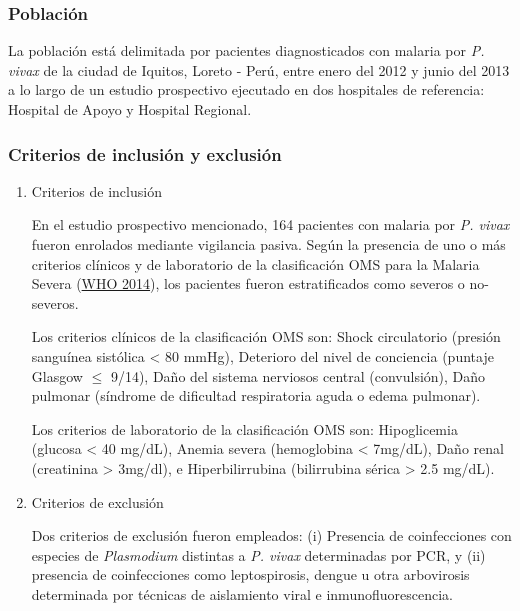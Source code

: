 \documentclass[
  a4paper]{article}
\begin{document}
\hypertarget{poblaciuxf3n}{%
\subsubsection{Población}\label{poblaciuxf3n}}

La población está delimitada por pacientes diagnosticados con malaria
por \emph{P. vivax} de la ciudad de Iquitos, Loreto - Perú, entre enero
del 2012 y junio del 2013 a lo largo de un estudio prospectivo ejecutado
en dos hospitales de referencia: Hospital de Apoyo y Hospital Regional.

\hypertarget{criterios-de-inclusiuxf3n-y-exclusiuxf3n}{%
\subsubsection{Criterios de inclusión y
exclusión}\label{criterios-de-inclusiuxf3n-y-exclusiuxf3n}}

\begin{enumerate}
\def\labelenumi{\alph{enumi}.}
\item
  Criterios de inclusión

  En el estudio prospectivo mencionado, 164 pacientes con malaria por
  \emph{P. vivax} fueron enrolados mediante vigilancia pasiva. Según la
  presencia de uno o más criterios clínicos y de laboratorio de la
  clasificación OMS para la Malaria Severa
  (\protect\hyperlink{ref-WHO2014severe}{WHO 2014}), los pacientes
  fueron estratificados como severos o no-severos.

  Los criterios clínicos de la clasificación OMS son: Shock circulatorio
  (presión sanguínea sistólica \textless{} 80 mmHg), Deterioro del nivel
  de conciencia (puntaje Glasgow \(\le\) 9/14), Daño del sistema
  nerviosos central (convulsión), Daño pulmonar (síndrome de dificultad
  respiratoria aguda o edema pulmonar).

  Los criterios de laboratorio de la clasificación OMS son: Hipoglicemia
  (glucosa \textless{} 40 mg/dL), Anemia severa (hemoglobina \textless{}
  7mg/dL), Daño renal (creatinina \textgreater{} 3mg/dl), e
  Hiperbilirrubina (bilirrubina sérica \textgreater{} 2.5 mg/dL).
\item
  Criterios de exclusión

  Dos criterios de exclusión fueron empleados: (i) Presencia de
  coinfecciones con especies de \emph{Plasmodium} distintas a \emph{P.
  vivax} determinadas por PCR, y (ii) presencia de coinfecciones como
  leptospirosis, dengue u otra arbovirosis determinada por técnicas de
  aislamiento viral e inmunofluorescencia.
\end{enumerate}
\end{document}
